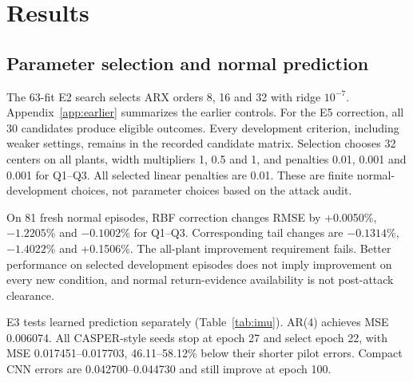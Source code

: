 \section{Results}\label{sec:results}
\subsection{Parameter selection and normal prediction}
The 63-fit E2 search selects ARX orders 8, 16 and 32 with ridge $10^{-7}$. Appendix~\ref{app:earlier} summarizes the earlier controls. For the E5 correction, all 30 candidates produce eligible outcomes. Every development criterion, including weaker settings, remains in the recorded candidate matrix. Selection chooses 32 centers on all plants, width multipliers 1, 0.5 and 1, and penalties 0.01, 0.001 and 0.001 for Q1--Q3. All selected linear penalties are 0.01. These are finite normal-development choices, not parameter choices based on the attack audit.



\begin{table}[t]\centering
\caption{Selected E5 candidate and fresh-normal changes against the base reference. Positive error change is worse. Each selected RBF head has 132 coefficients, in addition to its stored centers and base model.}\label{tab:selection}

\end{table}

On 81 fresh normal episodes, RBF correction changes RMSE by +0.0050\%, $-1.2205$\% and $-0.1002$\% for Q1--Q3. Corresponding tail changes are $-0.1314$\%, $-1.4022$\% and +0.1506\%. The all-plant improvement requirement fails. Better performance on selected development episodes does not imply improvement on every new condition, and normal return-evidence availability is not post-attack clearance.

E3 tests learned prediction separately (Table~\ref{tab:imu}). AR(4) achieves MSE 0.006074. All CASPER-style seeds stop at epoch 27 and select epoch 22, with MSE 0.017451--0.017703, 46.11--58.12\% below their shorter pilot errors. Compact CNN errors are 0.042700--0.044730 and still improve at epoch 100.

\begin{table}[t]\centering
\caption{E3 normal-development prediction on the common filtered IMU prefix. Epochs are completed/selected. Every seed and deterministic control is shown; no attack metric is computed.}\label{tab:imu}

\end{table}



